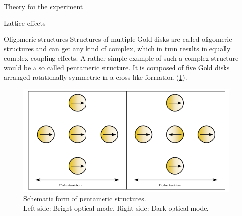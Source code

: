 \documentclass[pdftex, a4paper,11pt, twoside, UKenglish]{report}
\begin{document}
\begin{chapter}{Theory for the experiment}
\begin{section}{Lattice effects}
      
    \end{section}
    
    
    
    \begin{section}{Oligomeric structures}
      \label{chp:TheoryOligomerics}
      Structures of multiple Gold disks are called oligomeric structures and can
      get any kind of complex, which in turn results in equally complex coupling
      effects. A rather simple example of such a complex structure would be a
      so called pentameric structure. It is composed of five Gold disks arranged
      rotationally symmetric in a cross-like formation (\cref{fig:Pentamers}).
      \begin{figure}[hb!]
        \centering
        \includegraphics[width=.9\textwidth]{Figures/Pentamers.png}
        \caption{Schematic form of pentameric structures. \\
            Left side: Bright optical mode. Right side: Dark optical mode.}
        \label{fig:Pentamers}
      \end{figure}
      
      
      

\end{section}
\end{chapter}
\end{document}
